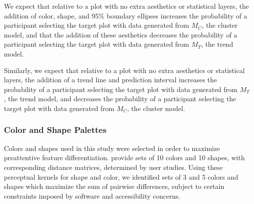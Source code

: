 \documentclass[12pt]{article}\usepackage[]{graphicx}\usepackage[]{color}
\begin{document}
We expect that relative to a plot with no extra aesthetics or statistical layers, the addition of color, shape, and 95\% boundary ellipses  increases the probability of a participant selecting the target plot with data generated from $M_C$, the cluster model, and that the addition of these aesthetics  decreases the probability of a participant selecting the target plot with data generated from $M_T$, the trend model. 

Similarly, we expect that relative to a plot with no extra aesthetics or statistical layers, the addition of a trend line and prediction interval  increases the probability of a participant selecting the target plot with data generated from $M_T$, the trend model, and decreases the probability of a participant selecting the target plot with data generated from $M_C$, the cluster model.

\subsubsection{Color and Shape Palettes}
Colors and shapes used in this study were selected in order to maximize preattentive feature differentiation. \citet{heer:2014} provide sets of 10 colors and 10 shapes, with corresponding distance matrices, determined by user studies. Using these perceptual kernels for shape and color, we identified sets of 3 and 5 colors and shapes which maximize the sum of pairwise differences, subject to certain constraints imposed by software and accessibility concerns. 
\end{document}
